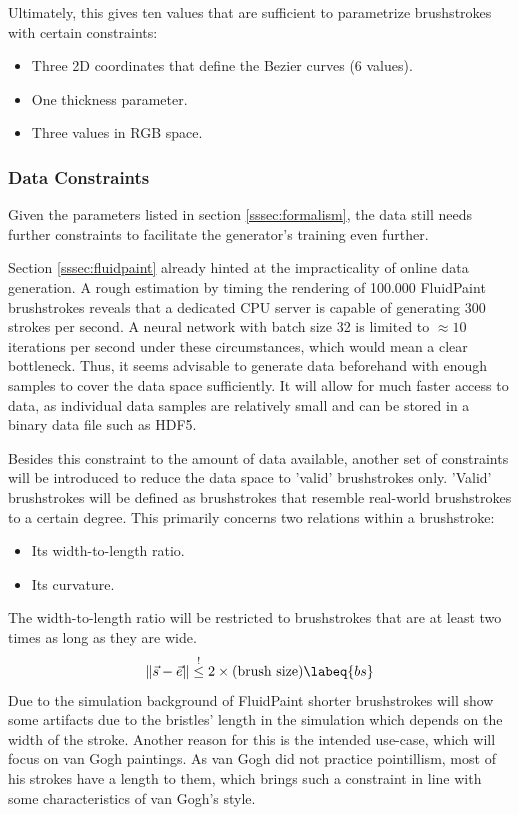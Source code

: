 Ultimately, this gives ten values that are sufficient to parametrize brushstrokes with certain constraints:
\begin{itemize}
    \item Three 2D coordinates that define the Bezier curves (6 values).
    \item One thickness parameter.
    \item Three values in RGB space.
\end{itemize}


\subsubsection{Data Constraints}

Given the parameters listed in section \ref{sssec:formalism}, the data still needs further constraints to facilitate the generator's training even further.

Section \ref{sssec:fluidpaint} already hinted at the impracticality of online data generation.
A rough estimation by timing the rendering of 100.000 FluidPaint brushstrokes reveals that a dedicated CPU server is capable of generating 300 strokes per second.
A neural network with batch size 32 is limited to $\approx 10$ iterations per second under these circumstances, which would mean a clear bottleneck.
Thus, it seems advisable to generate data beforehand with enough samples to cover the data space sufficiently.
It will allow for much faster access to data, as individual data samples are relatively small and can be stored in a binary data file such as HDF5.

Besides this constraint to the amount of data available, another set of constraints will be introduced to reduce the data space to 'valid' brushstrokes only.
'Valid' brushstrokes will be defined as brushstrokes that resemble real-world brushstrokes to a certain degree.
This primarily concerns two relations within a brushstroke:
\begin{itemize}
    \item Its width-to-length ratio.
    \item Its curvature.
\end{itemize}

The width-to-length ratio will be restricted to brushstrokes that are at least two times as long as they are wide.
\begin{equation}
\norm{\vec{s} - \vec{e}} \overset{!}{\leq}  2 \times (\text{brush size}) \labeq{bs}
\end{equation}
Due to the simulation background of FluidPaint shorter brushstrokes will show some artifacts due to the bristles' length in the simulation which depends on the width of the stroke.
Another reason for this is the intended use-case, which will focus on van Gogh paintings.
As van Gogh did not practice pointillism, most of his strokes have a length to them, which brings such a constraint in line with some characteristics of van Gogh's style.

